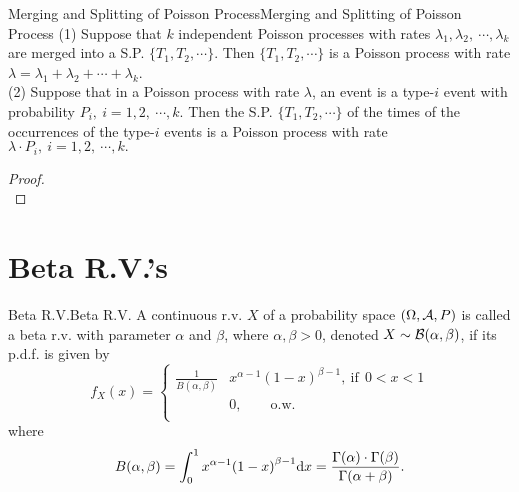 \documentclass{elegantbook}
\begin{document}
\begin{theorem}{Merging and Splitting of Poisson Process}{Merging and Splitting of Poisson Process}
(1) Suppose that $k$ independent Poisson processes with rates $\lambda_1,\lambda_2,\ \cdots,\lambda_k$ are merged into a S.P. $\{T_1,T_2,\cdots\}$. Then $\{T_1,T_2,\cdots\}$ is a Poisson process with rate $\lambda=\lambda_1+\lambda_2+\cdots+\lambda_k$.\\

(2) Suppose that in a Poisson process with rate $\lambda$, an event is a type-$i$ event with probability $P_i,\ i=1,2,\ \cdots,k.$ Then the S.P. $\{T_1,T_2,\cdots\}$ of the times of the occurrences of the type-$i$ events is a
 Poisson process with rate $\lambda\cdot P_i,\ i=1,2,\ \cdots,k.$
\end{theorem}

\begin{proof}
\\[4cm]\vspace{0.01cm}
\end{proof}

\section{Beta R.V.'s}

\begin{definition}{Beta R.V.}{Beta R.V.}
A continuous r.v. $X$ of a probability space $(\Omega,\mathcal{A}, P)$ is called a beta r.v. with parameter $\alpha$ and $\beta$, where $\alpha,\beta>0$, denoted $X\sim\mathcal{B}(\alpha,\beta)$, if its p.d.f. is given by
\[f_{X}(x) = \left\{ \begin{aligned}
\frac{1}{B(\alpha,\beta)}&x^{\alpha - 1}{(1 - x)}^{\beta - 1},\ \mathrm{\text{if}}\ \ 0 < x < 1 \\
&0, \qquad\mathrm{\text{o.w.}} \\
\end{aligned} \right.\]
where
\[B(\alpha,\beta) = \int_{0}^{1}x^{\alpha - 1}{(1 - x)}^{\beta - 1}\dif x = \frac{\Gamma( \alpha ) \cdot \Gamma( \beta )}{\Gamma( \alpha + \beta )}.\]
\end{definition}
\end{document}
